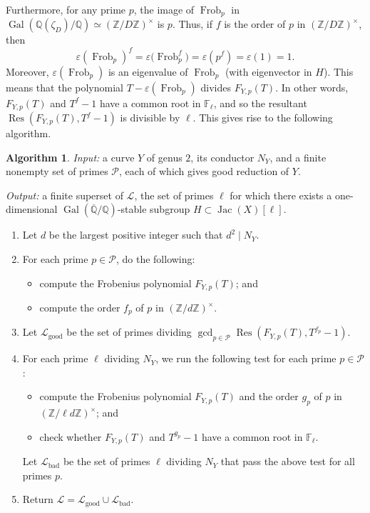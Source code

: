 \documentclass{amsproc}
\numberwithin{equation}{section}
\theoremstyle{definition}
\newtheorem{algorithm}[equation]{Algorithm}
\theoremstyle{remark}
\DeclareMathOperator{\Jac}{Jac}
\DeclareMathOperator{\Frob}{Frob}
\DeclareMathOperator{\Gal}{Gal}
\DeclareMathOperator{\Res}{Res}
\newcommand{\eps}{\varepsilon}
\newcommand{\ZZ}{\mathbb Z}
\newcommand{\QQ}{\mathbb Q}
\newcommand{\FF}{\mathbb F}
\newcommand{\Qbar}{\overline{\QQ}}
\newcommand{\GalQ}{\Gal(\Qbar/\QQ)}
\begin{document}
Furthermore, for any prime $p$, the image of $\Frob_p$ in $\Gal(\QQ(\zeta_D)/\QQ)\simeq (\ZZ/D\ZZ)^\times$ is $p$. Thus, if $f$ is the order of $p$ in $(\ZZ/D\ZZ)^\times$, then
\begin{equation}
\eps\left(\Frob_p\right)^f = \eps\big(\Frob_p ^f\big) = \eps\left(p^f\right) = \eps(1) = 1.
\end{equation}
Moreover, $\eps(\Frob_p)$ is an eigenvalue of $\Frob_p$ (with eigenvector in $H$). This means that the polynomial $T-\eps(\Frob_p)$ divides $F_{Y,p}(T)$. In other words, $F_{Y,p}(T)$ and $T^f-1$ have a common root in $\FF_\ell$, and so the resultant $\Res(F_{Y,p}(T), T^f-1)$ is divisible by $\ell$. This gives rise to the following algorithm.
\begin{algorithm}
    \label{alg:H_test}
    \emph{Input:} a curve $Y$ of genus $2$, its conductor $N_Y$, and a finite nonempty set of primes $\mathcal P$, each of which gives good reduction of $Y$.

    \emph{Output:} a finite superset of $\mathcal L$, the set of primes $\ell$ for which there exists a one-dimensional $\GalQ$-stable subgroup $H\subset\Jac(X)[\ell]$.

    \begin{enumerate}
    \item Let $d$ be the largest positive integer such that $d^2\mid N_Y$.
    \item For each prime $p\in\mathcal P$, do the following:
    \begin{itemize}
        \item compute the Frobenius polynomial $F_{Y,p}(T)$; and
        \item compute the order $f_p$ of $p$ in $(\ZZ/d\ZZ)^\times$.
    \end{itemize}
    \item Let $\mathcal L_{\text{good}}$ be the set of primes dividing $\gcd_{p\in\mathcal P} \Res(F_{Y,p}(T), T^{f_p}-1).$
    \item For each prime $\ell$ dividing $N_Y$, we run the following test for each prime $p\in \mathcal P$:
    \begin{itemize}
        \item compute the Frobenius polynomial $F_{Y,p}(T)$ and the order $g_p$ of $p$ in $(\ZZ/\ell d\ZZ)^\times$; and
        \item check whether $F_{Y,p}(T)$ and $T^{g_p}-1$ have a common root in $\FF_\ell$.
    \end{itemize}
    Let $\mathcal L_{\text{bad}}$ be the set of primes $\ell$ dividing $N_Y$ that pass the above test for all primes $p$.
    \item Return $\mathcal L = \mathcal L_{\text{good}}\cup\mathcal L_{\text{bad}}$.
    \end{enumerate}
\end{algorithm}
\end{document}
